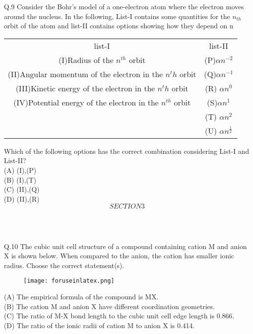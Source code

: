 \documentclass[11pt]{article}
\begin{document}
Q.9 Consider the Bohr's model of a one-electron atom where the electron moves around the nucleus. In the following, List-I contains some quantities for the $n_{th}$ orbit of the atom and list-II contains options showing how they depend on n\\
\begin{tabular}{c c}
list-I & list-II\\
(I)Radius of the $n^{th}$ orbit & (P)$\alpha n^{-2}$\\
(II)Angular momentum of the electron in the $n^th$ orbit & (Q)$\alpha n^{-1}$\\
(III)Kinetic energy of the electron in the $n^th$ orbit & (R) $\alpha n^0$ \\
(IV)Potential energy of the electron in the $n^{th}$ orbit & (S)$\alpha n^1$\\
 & (T) $\alpha n^2$\\
 & (U) $\alpha n^{\frac{1}{2}}$\\
\end{tabular}
Which of the following options has the correct combination considering List-I and List-II?\\
(A) (I),(P) \\
(B) (I),(T)\\
(C) (II),(Q)\\
(D) (II),(R)\\
\newpage
                    $$SECTION3$$\\
\begin{center}
 \\
\end{center}

Q.10 The cubic unit cell structure of a compound containing cation M and anion X is shown below. When compared to the anion, the cation has smaller ionic radius. Choose the correct statement(s).
\newpage
\begin{center}
\begin{figure}
\texttt{[image: foruseinlatex.png]}
\end{figure}
\end{center}

(A)	The empirical formula of the compound is MX. \\
(B)	The cation M and anion X have different coordination geometries.\\ 
(C)	The ratio of M-X bond length to the cubic unit cell edge length is 0.866.\\ 
(D)	The ratio of the ionic radii of cation M to anion X is 0.414.
\end{document}
